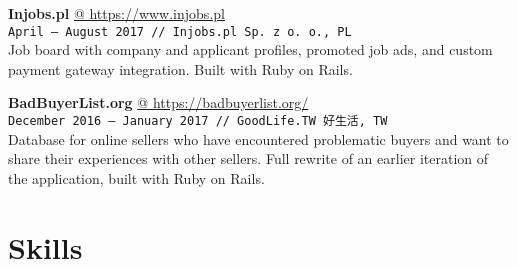 \documentclass[10pt,a4paper]{article}
\makeatletter
\newcommand{\projectweb}[4]{\par\vspace{1em}\textbf{\normalsize #1} \href{#2}{\color{darkgray} @ #2}\\[1pt]{\small\texttt{#3 // #4}}\\[4pt]}
\makeatother
\begin{document}
\begin{minipage}[t]{0.67\textwidth}
  \projectweb{Injobs.pl}{https://www.injobs.pl}{April {–} August 2017}{Injobs.pl Sp. z o. o., PL}

  \small
  Job board with company and applicant profiles, promoted job ads, and custom payment gateway integration. Built with Ruby on Rails.

  \projectweb{BadBuyerList.org}{https://badbuyerlist.org/}{December 2016 {–} January 2017}{GoodLife.TW 好生活, TW}

  \small
  Database for online sellers who have encountered problematic buyers and want to share their experiences with other sellers. Full rewrite of an earlier iteration of the application, built with Ruby on Rails.

\end{minipage}\hspace{0.03\textwidth}%
\begin{minipage}[t]{0.3\textwidth}
  \section{Skills}

\end{minipage}
\end{document}
